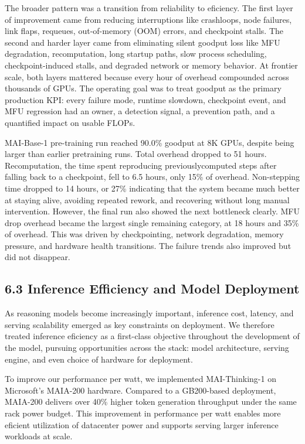 \documentclass[
  10
]{article}
\begin{document}
The broader pattern was a transition from reliability to eficiency. The
first layer of improvement came from reducing interruptions like
crashloops, node failures, link flaps, requeues, out-of-memory (OOM)
errors, and checkpoint stalls. The second and harder layer came from
eliminating silent goodput loss like MFU degradation, recomputation,
long startup paths, slow process scheduling, checkpoint-induced stalls,
and degraded network or memory behavior. At frontier scale, both layers
mattered because every hour of overhead compounded across thousands of
GPUs. The operating goal was to treat goodput as the primary production
KPI: every failure mode, runtime slowdown, checkpoint event, and MFU
regression had an owner, a detection signal, a prevention path, and a
quantified impact on usable FLOPs.

MAI-Base-1 pre-training run reached 90.0\% goodput at 8K GPUs, despite
being larger than earlier pretraining runs. Total overhead dropped to 51
hours. Recomputation, the time spent reproducing previouslycomputed
steps after falling back to a checkpoint, fell to 6.5 hours, only 15\%
of overhead. Non-stepping time dropped to 14 hours, or 27\% indicating
that the system became much better at staying alive, avoiding repeated
rework, and recovering without long manual intervention. However, the
final run also showed the next bottleneck clearly. MFU drop overhead
became the largest single remaining category, at 18 hours and 35\% of
overhead. This was driven by checkpointing, network degradation, memory
pressure, and hardware health transitions. The failure trends also
improved but did not disappear.

\subsection{6.3 Inference Efficiency and Model
Deployment}\label{inference-efficiency-and-model-deployment}

As reasoning models become increasingly important, inference cost,
latency, and serving scalability emerged as key constraints on
deployment. We therefore treated inference eficiency as a first-class
objective throughout the development of the model, pursuing
opportunities across the stack: model architecture, serving engine, and
even choice of hardware for deployment.

To improve our performance per watt, we implemented MAI-Thinking-1 on
Microsoft's MAIA-200 hardware. Compared to a GB200-based deployment,
MAIA-200 delivers over 40\% higher token generation throughput under the
same rack power budget. This improvement in performance per watt enables
more eficient utilization of datacenter power and supports serving
larger inference workloads at scale.
\end{document}
